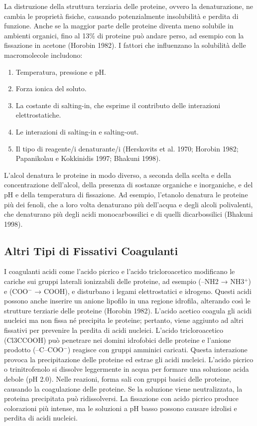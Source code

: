 La distruzione della struttura terziaria delle proteine, ovvero la denaturazione, ne cambia le proprietà fisiche, causando potenzialmente insolubilità e perdita di funzione. Anche se la maggior parte delle proteine diventa meno solubile in ambienti organici, fino al 13\% di proteine può andare perso, ad esempio con la fissazione in acetone (Horobin 1982). I fattori che influenzano la solubilità delle macromolecole includono:

\begin{enumerate}
    \item Temperatura, pressione e pH.
    \item Forza ionica del soluto.
    \item La costante di salting-in, che esprime il contributo delle interazioni elettrostatiche.
    \item Le interazioni di salting-in e salting-out.
    \item Il tipo di reagente/i denaturante/i (Herskovits et al. 1970; Horobin 1982; Papanikolau e Kokkinidis 1997; Bhakuni 1998).
\end{enumerate}

L'alcol denatura le proteine in modo diverso, a seconda della scelta e della concentrazione dell'alcol, della presenza di sostanze organiche e inorganiche, e del pH e della temperatura di fissazione. Ad esempio, l'etanolo denatura le proteine più dei fenoli, che a loro volta denaturano più dell'acqua e degli alcoli polivalenti, che denaturano più degli acidi monocarbossilici e di quelli dicarbossilici (Bhakuni 1998).

\subsection{Altri Tipi di Fissativi Coagulanti}
I coagulanti acidi come l'acido picrico e l'acido tricloroacetico modificano le cariche sui gruppi laterali ionizzabili delle proteine, ad esempio (–NH2 → NH3\(^+\)) e (COO\(^{-}\) → COOH), e disturbano i legami elettrostatici e idrogeno. Questi acidi possono anche inserire un anione lipofilo in una regione idrofila, alterando così le strutture terziarie delle proteine (Horobin 1982). L'acido acetico coagula gli acidi nucleici ma non fissa né precipita le proteine; pertanto, viene aggiunto ad altri fissativi per prevenire la perdita di acidi nucleici. L'acido tricloroacetico (Cl3CCOOH) può penetrare nei domini idrofobici delle proteine e l'anione prodotto (–C–COO\(^{-}\)) reagisce con gruppi amminici caricati. Questa interazione provoca la precipitazione delle proteine ed estrae gli acidi nucleici. L'acido picrico o trinitrofenolo si dissolve leggermente in acqua per formare una soluzione acida debole (pH 2.0). Nelle reazioni, forma sali con gruppi basici delle proteine, causando la coagulazione delle proteine. Se la soluzione viene neutralizzata, la proteina precipitata può ridissolversi. La fissazione con acido picrico produce colorazioni più intense, ma le soluzioni a pH basso possono causare idrolisi e perdita di acidi nucleici.

